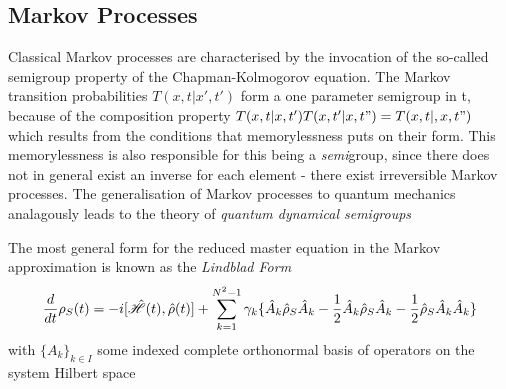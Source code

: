 \subsection{Markov Processes}
Classical Markov processes are characterised by the invocation of the so-called semigroup property of the Chapman-Kolmogorov equation. The Markov transition probabilities $T(x, t|x', t')$ form a one parameter semigroup in t, because of the composition property $T(x, t|x, t')T(x, t'|x, t") = T(x, t|,x, t")$ which results from the conditions that memorylessness puts on their form. This memorylessness is also responsible for this being a \emph{semi}group, since there does not in general exist an inverse for each element - there exist irreversible Markov processes.
The generalisation of Markov processes to quantum mechanics analagously leads to the theory of \emph{quantum dynamical semigroups}

The most general form\autocite[119--122]{Breuer2002} for the reduced master equation in the Markov approximation is known as the \emph{Lindblad Form}
\begin{equation}
	\frac{d}{dt} \rho_S (t) = -i[\hat{\mathscr{H}} (t), \hat{\rho} (t)] + \sum_{k=1}^{N^2-1} \gamma_k \{ \hat{A}_k \hat{\rho}_S \hat{A}_k -\frac{1}{2}  \hat{A}_k \hat{\rho}_S \hat{A}_k -\frac{1}{2} \hat{\rho}_S \hat{A}_k \hat{A}_k \}
\end{equation}
with $\{A_k\}_{k \in I}$ some indexed complete orthonormal basis of operators on the system Hilbert space

